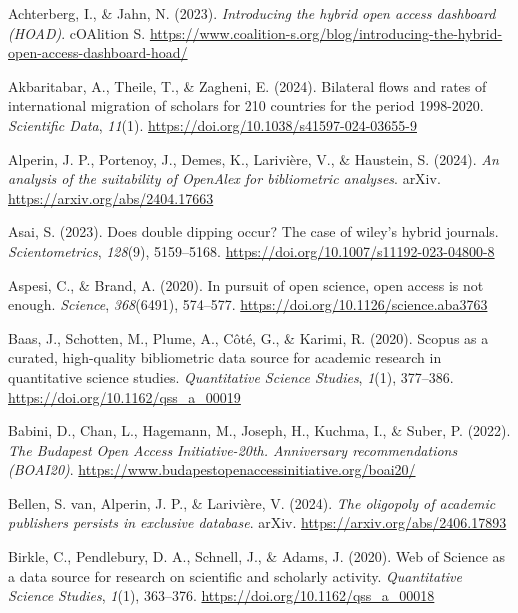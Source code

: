 \documentclass[a4paper,man,floatsintext,longtable,noextraspace,10pt]{apa6}
\newlength{\cslhangindent}
\newenvironment{CSLReferences}[2] %
{\begin{list}{}{%
  \setlength{\itemindent}{0pt}
  \setlength{\leftmargin}{0pt}
  \setlength{\parsep}{0pt}
  \ifodd #1
  \setlength{\leftmargin}{\cslhangindent}
  \setlength{\itemindent}{-1\cslhangindent}
  \fi
  \setlength{\itemsep}{#2\baselineskip}}}
{\end{list}}
\begin{document}
\label{refs}
\begin{CSLReferences}{1}{0}
Achterberg, I., \& Jahn, N. (2023). \emph{Introducing the hybrid open
access dashboard (HOAD)}. {cOAlition S}.
\url{https://www.coalition-s.org/blog/introducing-the-hybrid-open-access-dashboard-hoad/}

Akbaritabar, A., Theile, T., \& Zagheni, E. (2024). Bilateral flows and
rates of international migration of scholars for 210 countries for the
period 1998-2020. \emph{Scientific Data}, \emph{11}(1).
\url{https://doi.org/10.1038/s41597-024-03655-9}

Alperin, J. P., Portenoy, J., Demes, K., Larivière, V., \& Haustein, S.
(2024). \emph{An analysis of the suitability of OpenAlex for
bibliometric analyses}. arXiv. \url{https://arxiv.org/abs/2404.17663}

Asai, S. (2023). Does double dipping occur? The case of wiley's hybrid
journals. \emph{Scientometrics}, \emph{128}(9), 5159--5168.
\url{https://doi.org/10.1007/s11192-023-04800-8}

Aspesi, C., \& Brand, A. (2020). In pursuit of open science, open access
is not enough. \emph{Science}, \emph{368}(6491), 574--577.
\url{https://doi.org/10.1126/science.aba3763}

Baas, J., Schotten, M., Plume, A., Côté, G., \& Karimi, R. (2020).
Scopus as a curated, high-quality bibliometric data source for academic
research in quantitative science studies. \emph{Quantitative Science
Studies}, \emph{1}(1), 377--386.
\url{https://doi.org/10.1162/qss_a_00019}

Babini, D., Chan, L., Hagemann, M., Joseph, H., Kuchma, I., \& Suber, P.
(2022). \emph{{The Budapest Open Access Initiative-20th. Anniversary
recommendations (BOAI20)}}.
\url{https://www.budapestopenaccessinitiative.org/boai20/}

Bellen, S. van, Alperin, J. P., \& Larivière, V. (2024). \emph{The
oligopoly of academic publishers persists in exclusive database}. arXiv.
\url{https://arxiv.org/abs/2406.17893}

Birkle, C., Pendlebury, D. A., Schnell, J., \& Adams, J. (2020). {Web of
Science} as a data source for research on scientific and scholarly
activity. \emph{Quantitative Science Studies}, \emph{1}(1), 363--376.
\url{https://doi.org/10.1162/qss_a_00018}


\end{CSLReferences}
\end{document}
